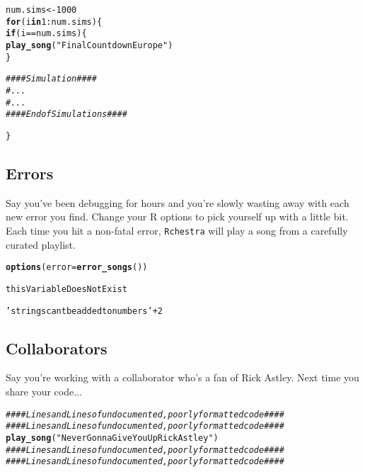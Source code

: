 \documentclass{article}\usepackage[]{graphicx}\usepackage[]{color}
\makeatletter
\newcommand{\hlnum}[1]{\textcolor[rgb]{0.686,0.059,0.569}{#1}}%
\newcommand{\hlstr}[1]{\textcolor[rgb]{0.192,0.494,0.8}{#1}}%
\newcommand{\hlcom}[1]{\textcolor[rgb]{0.678,0.584,0.686}{\textit{#1}}}%
\newcommand{\hlopt}[1]{\textcolor[rgb]{0,0,0}{#1}}%
\newcommand{\hlstd}[1]{\textcolor[rgb]{0.345,0.345,0.345}{#1}}%
\newcommand{\hlkwa}[1]{\textcolor[rgb]{0.161,0.373,0.58}{\textbf{#1}}}%
\newcommand{\hlkwb}[1]{\textcolor[rgb]{0.69,0.353,0.396}{#1}}%
\newcommand{\hlkwc}[1]{\textcolor[rgb]{0.333,0.667,0.333}{#1}}%
\newcommand{\hlkwd}[1]{\textcolor[rgb]{0.737,0.353,0.396}{\textbf{#1}}}%
\newenvironment{kframe}{%
 \def\at@end@of@kframe{}%
 \ifinner\ifhmode%
  \def\at@end@of@kframe{\end{minipage}}%
  \begin{minipage}{\columnwidth}%
 \fi\fi%
 \def\FrameCommand##1{\hskip\@totalleftmargin \hskip-\fboxsep
 \colorbox{shadecolor}{##1}\hskip-\fboxsep
     \hskip-\linewidth \hskip-\@totalleftmargin \hskip\columnwidth}%
 \MakeFramed {\advance\hsize-\width
   \@totalleftmargin\z@ \linewidth\hsize
   \@setminipage}}%
 {\par\unskip\endMakeFramed%
 \at@end@of@kframe}
\newenvironment{knitrout}{}{} %
\makeatother
\begin{document}
\begin{knitrout}
\color{fgcolor}\begin{kframe}
\begin{alltt}
\hlstd{num.sims} \hlkwb{<-} \hlnum{1000}
\hlkwa{for}\hlstd{(i} \hlkwa{in} \hlnum{1}\hlopt{:}\hlstd{num.sims)\{}
  \hlkwa{if}\hlstd{(i} \hlopt{==} \hlstd{num.sims)\{}
    \hlkwd{play_song}\hlstd{(}\hlstr{"Final Countdown Europe"}\hlstd{)}
  \hlstd{\}}

  \hlcom{#### Simulation ####}
  \hlcom{# ...}
  \hlcom{# ...}
  \hlcom{#### End of Simulations ####}

\hlstd{\}}
\end{alltt}
\end{kframe}
\end{knitrout}


\subsection{Errors}
Say you've been debugging for hours and you're slowly wasting away with each new error you find. Change your R options to pick yourself up with a little bit. Each time you hit a non-fatal error, \texttt{Rchestra} will play a song from a carefully curated playlist.

\begin{knitrout}
\color{fgcolor}\begin{kframe}
\begin{alltt}
\hlkwd{options}\hlstd{(}\hlkwc{error} \hlstd{=} \hlkwd{error_songs}\hlstd{())}

\hlstd{thisVariableDoesNotExist}

\hlstr{'strings cant be added to numbers'} \hlopt{+} \hlnum{2}
\end{alltt}
\end{kframe}
\end{knitrout}

\subsection{Collaborators}
Say you're working with a collaborator who's a fan of Rick Astley. Next time you share your code...
\begin{knitrout}
\color{fgcolor}\begin{kframe}
\begin{alltt}
\hlcom{#### Lines and Lines of undocumented, poorly formatted code ####}
\hlcom{#### Lines and Lines of undocumented, poorly formatted code ####}
\hlkwd{play_song}\hlstd{(}\hlstr{"Never Gonna Give You Up Rick Astley"}\hlstd{)}
\hlcom{#### Lines and Lines of undocumented, poorly formatted code ####}
\hlcom{#### Lines and Lines of undocumented, poorly formatted code ####}
\end{alltt}
\end{kframe}
\end{knitrout}
\end{document}
